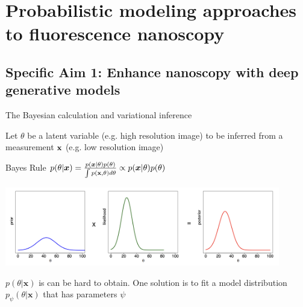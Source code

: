 \documentclass{beamer}					%
\begin{document}


\section{Probabilistic modeling approaches to fluorescence nanoscopy}


\subsection{Specific Aim 1: Enhance nanoscopy with deep generative models}

\begin{frame}{The Bayesian calculation and variational inference}

Let $\theta$ be a latent variable (e.g. high resolution image) to be inferred from a measurement $\bold{x}$ (e.g. low resolution image)\\

\begin{alertblock}{Bayes Rule}
$p(\theta\lvert \boldsymbol{x}) = \frac{p(\boldsymbol{x}\lvert \theta)p(\theta)}{\int p(\bold{x},\theta)d\theta} \propto p(\boldsymbol{x}\lvert \theta)p(\theta)$
\end{alertblock}

\includegraphics[width=12cm]{../../dissertation/dissertation/media/BayesRule.png}

$p(\theta\lvert \boldsymbol{x})$ is can be hard to obtain. One solution is to fit a model distribution $p_{\psi}(\theta\lvert \boldsymbol{x})$ that has parameters $\psi$

\end{frame}
\end{document}
